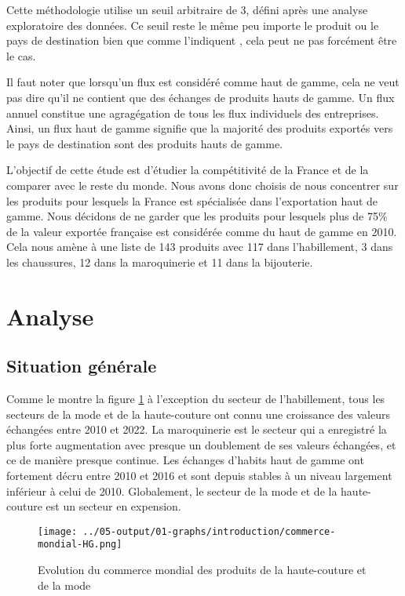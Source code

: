 \documentclass[french,10pt,a4paper]{article}
\begin{document}
Cette méthodologie utilise un seuil arbitraire de 3, défini après une analyse exploratoire des données. Ce seuil reste le même peu importe le produit ou le pays de destination bien que comme l'indiquent \cite{Martin2015}, cela peut ne pas forcément être le cas. 

Il faut noter que lorsqu'un flux est considéré comme haut de gamme, cela ne veut pas dire qu'il ne contient que des échanges de produits hauts de gamme. Un flux annuel constitue une agragégation de tous les flux individuels des entreprises. Ainsi, un flux haut de gamme signifie que la majorité des produits exportés vers le pays de destination sont des produits hauts de gamme.

\medskip

L'objectif de cette étude est d'étudier la compétitivité de la France et de la comparer avec le reste du monde. Nous avons donc choisis de nous concentrer sur les produits pour lesquels la France est spécialisée dans l'exportation haut de gamme. Nous décidons de ne garder que les produits pour lesquels plus de 75\% de la valeur exportée française est considérée comme du haut de gamme en 2010. Cela nous amène à une liste de 143 produits avec 117 dans l'habillement, 3 dans les chaussures, 12 dans la maroquinerie et 11 dans la bijouterie.


\section{Analyse}

\subsection{Situation générale}

Comme le montre la figure \ref{fig:commerce-mondial-HG} à l'exception du secteur de l'habillement, tous les secteurs de la mode et de la haute-couture ont connu une croissance des valeurs échangées entre 2010 et 2022. La maroquinerie est le secteur qui a enregistré la plus forte augmentation avec presque un doublement de ses valeurs échangées, et ce de manière presque continue. Les échanges d'habits haut de gamme ont fortement décru entre 2010 et 2016 et sont depuis stables à un niveau largement inférieur à celui de 2010. Globalement, le secteur de la mode et de la haute-couture est un secteur en expension.

\begin{figure}[!h]
  \centering
  \texttt{[image: ../05-output/01-graphs/introduction/commerce-mondial-HG.png]}
  \caption{Evolution du commerce mondial des produits de la haute-couture et de la mode}
  \label{fig:commerce-mondial-HG}
\end{figure}
\end{document}
